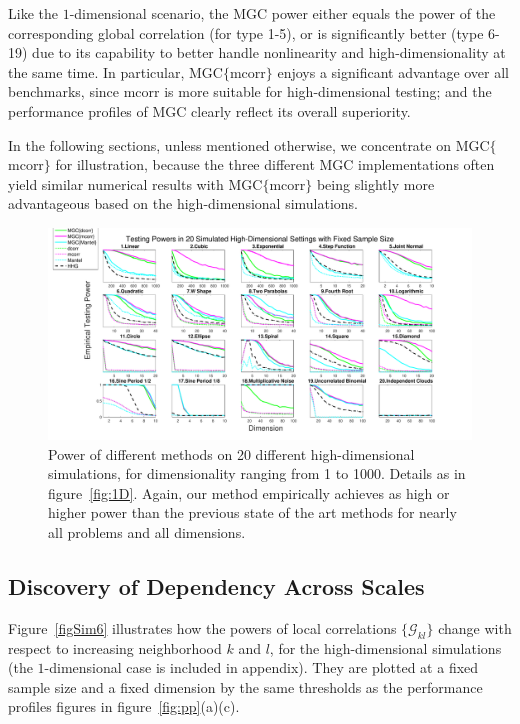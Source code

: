 \documentclass[11pt]{article}
\newcommand{\G}{\mathcal{G}}
\begin{document}
Like the $1$-dimensional scenario, the MGC power either equals the power of the corresponding global correlation (for type 1-5), or is significantly better (type 6-19) due to its capability to better handle nonlinearity and high-dimensionality at the same time. In particular, MGC$\{$mcorr$\}$ enjoys a significant advantage over all benchmarks, since mcorr is more suitable for high-dimensional testing; and the performance profiles of MGC clearly reflect its overall superiority. 

In the following sections, unless mentioned otherwise, we concentrate on MGC$\{$mcorr$\}$ for illustration, because the three different MGC implementations often yield similar numerical results with MGC$\{$mcorr$\}$ being slightly more advantageous based on the high-dimensional simulations.

\begin{figure}[htbp]
\includegraphics[width=1.0\textwidth]{Figures/Fig5}
\caption{Power of different methods on 20 different high-dimensional simulations, for dimensionality ranging from 1 to 1000.  Details as in figure~\ref{fig:1D}.
Again, our method empirically achieves as high or higher power than the previous state of the art methods for nearly all problems and all dimensions.
}
\label{fig:nD}
\end{figure}

\subsection{Discovery of Dependency Across Scales}
\label{main3}

Figure~\ref{figSim6} illustrates how the powers of local correlations $\{\G_{kl}\}$ change with respect to increasing neighborhood $k$ and $l$, for the high-dimensional simulations (the $1$-dimensional case is included in appendix). They are plotted at a fixed sample size and a fixed dimension by the same thresholds as the performance profiles figures in figure~\ref{fig:pp}(a)(c). 
\end{document}
